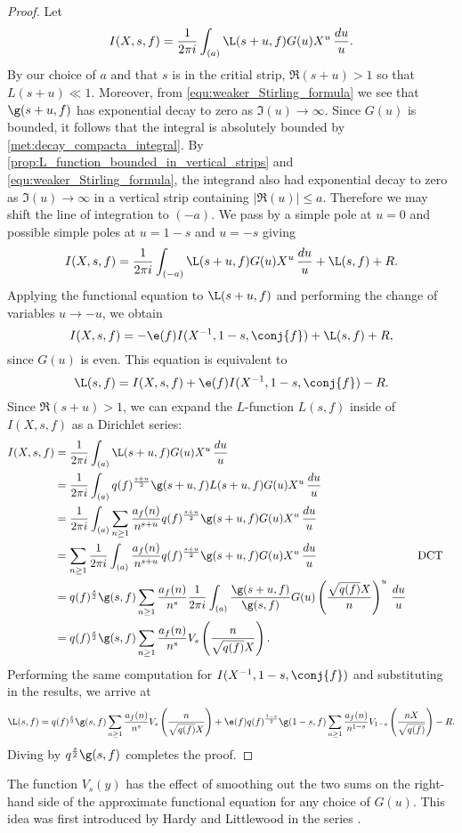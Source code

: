       \begin{proof}
        Let
        \[
          I(X,s,f) = \frac{1}{2\pi i}\int_{(a)}\L(s+u,f)G(u)X^{u}\,\frac{du}{u}.
        \]
        By our choice of $a$ and that $s$ is in the critial strip, $\Re(s+u) > 1$ so that $L(s+u) \ll 1$. Moreover, from \cref{equ:weaker_Stirling_formula} we see that $\g(s+u,f)$ has exponential decay to zero as $\Im(u) \to \infty$. Since $G(u)$ is bounded, it follows that the integral is absolutely bounded by \cref{met:decay_compacta_integral}. By \cref{prop:L_function_bounded_in_vertical_strips} and \cref{equ:weaker_Stirling_formula}, the integrand also had exponential decay to zero as $\Im(u) \to \infty$ in a vertical strip containing $|\Re(u)| \le a$. Therefore we may shift the line of integration to $(-a)$. We pass by a simple pole at $u = 0$ and possible simple poles at $u = 1-s$ and $u = -s$ giving
        \[
          I(X,s,f) = \frac{1}{2\pi i}\int_{(-a)}\L(s+u,f)G(u)X^{u}\,\frac{du}{u}+\L(s,f)+R.
        \]
        Applying the functional equation to $\L(s+u,f)$ and performing the change of variables $u \to -u$, we obtain
        \[
          I(X,s,f) = -\e(f)I(X^{-1},1-s,\conj{f})+\L(s,f)+R,
        \]
        since $G(u)$ is even. This equation is equivalent to
        \[
          \L(s,f) = I(X,s,f)+\e(f)I(X^{-1},1-s,\conj{f})-R.
        \]
        Since $\Re(s+u) > 1$, we can expand the $L$-function $L(s,f)$ inside of $I(X,s,f)$ as a Dirichlet series:
        \begin{align*}
          I(X,s,f) &= \frac{1}{2\pi i}\int_{(a)}\L(s+u,f)G(u)X^{u}\,\frac{du}{u} \\
          &= \frac{1}{2\pi i}\int_{(a)}q(f)^{\frac{s+u}{2}}\g(s+u,f)L(s+u,f)G(u)X^{u}\,\frac{du}{u} \\
          &= \frac{1}{2\pi i}\int_{(a)}\sum_{n \ge 1}\frac{a_{f}(n)}{n^{s+u}}q(f)^{\frac{s+u}{2}}\g(s+u,f)G(u)X^{u}\,\frac{du}{u} \\
          &= \sum_{n \ge 1}\frac{1}{2\pi i}\int_{(a)}\frac{a_{f}(n)}{n^{s+u}}q(f)^{\frac{s+u}{2}}\g(s+u,f)G(u)X^{u}\,\frac{du}{u} && \text{DCT} \\
          &= q(f)^{\frac{s}{2}}\g(s,f)\sum_{n \ge 1}\frac{a_{f}(n)}{n^{s}}\frac{1}{2\pi i}\int_{(a)}\frac{\g(s+u,f)}{\g(s,f)}G(u)\left(\frac{\sqrt{q(f)}X}{n}\right)^{u}\,\frac{du}{u} \\
          &= q(f)^{\frac{s}{2}}\g(s,f)\sum_{n \ge 1}\frac{a_{f}(n)}{n^{s}}V_{s}\left(\frac{n}{\sqrt{q(f)}X}\right).
        \end{align*}
        Performing the same computation for $I(X^{-1},1-s,\conj{f})$ and substituting in the results, we arrive at
        \[
          \L(s,f) = q(f)^{\frac{s}{2}}\g(s,f)\sum_{n \ge 1}\frac{a_{f}(n)}{n^{s}}V_{s}\left(\frac{n}{\sqrt{q(f)}X}\right)+\e(f)q(f)^{\frac{1-s}{2}}\g(1-s,f)\sum_{n \ge 1}\frac{a_{f}(n)}{n^{1-s}}V_{1-s}\left(\frac{nX}{\sqrt{q(f)}}\right)-R.
        \]
        Diving by $q^{\frac{s}{2}}\g(s,f)$ completes the proof.
      \end{proof}

      The function $V_{s}(y)$ has the effect of smoothing out the two sums on the right-hand side of the approximate functional equation for any choice of $G(u)$. This idea was first introduced by Hardy and Littlewood in the series \cite{hardyzeros1921,hardyapproximate1923,hardyapproximate1929}.